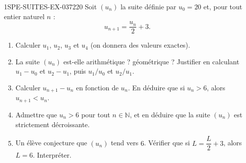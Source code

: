 \begin{exercice}{1SPE-SUITES-EX-037}{2}{20}
Soit $(u_n)$ la suite définie par $u_0 = 20$ et, pour tout entier naturel $n$ :
\[
  u_{n+1} = \frac{u_n}{2} + 3.
\]

\begin{enumerate}
  \item Calculer $u_1$, $u_2$, $u_3$ et $u_4$ (on donnera des valeurs exactes).

  \item La suite $(u_n)$ est-elle arithmétique ? géométrique ? Justifier en calculant $u_1 - u_0$ et $u_2 - u_1$, puis $u_1/u_0$ et $u_2/u_1$.

  \item Calculer $u_{n+1} - u_n$ en fonction de $u_n$. En déduire que si $u_n > 6$, alors $u_{n+1} < u_n$.

  \item Admettre que $u_n > 6$ pour tout $n \in \mathbb{N}$, et en déduire que la suite $(u_n)$ est strictement décroissante.

  \item Un élève conjecture que $(u_n)$ tend vers $6$. Vérifier que si $L = \dfrac{L}{2} + 3$, alors $L = 6$. Interpréter.
\end{enumerate}
\end{exercice}
